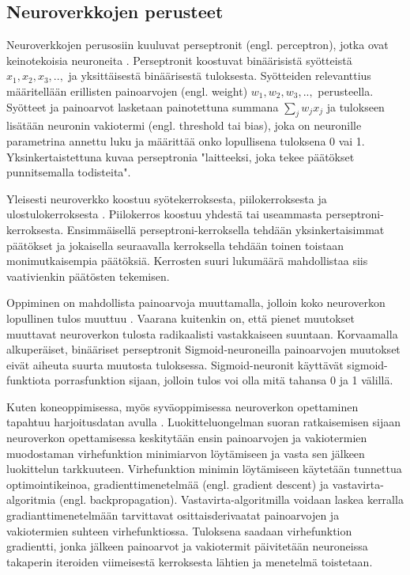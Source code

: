 \documentclass[utf8]{gradu3}
\begin{document}
\subsection{Neuroverkkojen perusteet}

Neuroverkkojen perusosiin kuuluvat perseptronit (engl. perceptron), jotka ovat keinotekoisia neuroneita \parencite{nielsen2015neural}. Perseptronit koostuvat binäärisistä syötteistä \(x_{1}, x_{2}, x_{3},..,\) ja yksittäisestä binäärisestä tuloksesta. Syötteiden relevanttius määritellään erillisten painoarvojen (engl. weight) \(w_{1}, w_{2}, w_{3},..,\) perusteella. Syötteet ja painoarvot lasketaan painotettuna summana $\sum_{j}w_{j}x_{j}$ ja tulokseen lisätään neuronin vakiotermi (engl. threshold tai bias), joka on neuronille parametrina annettu luku ja määrittää onko lopullisena tuloksena 0 vai 1. Yksinkertaistettuna \cite{nielsen2015neural} kuvaa perseptronia "laitteeksi, joka tekee päätökset punnitsemalla todisteita".

Yleisesti neuroverkko koostuu syötekerroksesta, piilokerroksesta ja ulostulokerroksesta \parencite{nielsen2015neural}. Piilokerros koostuu yhdestä tai useammasta perseptroni-kerroksesta. Ensimmäisellä perseptroni-kerroksella tehdään yksinkertaisimmat päätökset ja jokaisella seuraavalla kerroksella tehdään toinen toistaan monimutkaisempia päätöksiä. Kerrosten suuri lukumäärä mahdollistaa siis vaativienkin päätösten tekemisen.

Oppiminen on mahdollista painoarvoja muuttamalla, jolloin koko neuroverkon lopullinen tulos muuttuu \parencite{nielsen2015neural}. Vaarana kuitenkin on, että pienet muutokset muuttavat neuroverkon tulosta radikaalisti vastakkaiseen suuntaan. Korvaamalla alkuperäiset, binääriset perseptronit Sigmoid-neuroneilla painoarvojen muutokset eivät aiheuta suurta muutosta tuloksessa. Sigmoid-neuronit käyttävät sigmoid-funktiota porrasfunktion sijaan, jolloin tulos voi olla mitä tahansa 0 ja 1 välillä.

Kuten koneoppimisessa, myös syväoppimisessa neuroverkon opettaminen tapahtuu harjoitusdatan avulla \parencite{nielsen2015neural}. Luokitteluongelman suoran ratkaisemisen sijaan neuroverkon opettamisessa keskitytään ensin painoarvojen ja vakiotermien muodostaman virhefunktion minimiarvon löytämiseen ja vasta sen jälkeen luokittelun tarkkuuteen. Virhefunktion minimin löytämiseen käytetään tunnettua optimointikeinoa, gradienttimenetelmää (engl. gradient descent) ja vastavirta-algoritmia (engl. backpropagation). Vastavirta-algoritmilla voidaan laskea kerralla gradianttimenetelmään tarvittavat osittaisderivaatat painoarvojen ja vakiotermien suhteen virhefunktiossa. Tuloksena saadaan virhefunktion gradientti, jonka jälkeen painoarvot ja vakiotermit päivitetään neuroneissa takaperin iteroiden viimeisestä kerroksesta lähtien ja menetelmä toistetaan.
\end{document}
